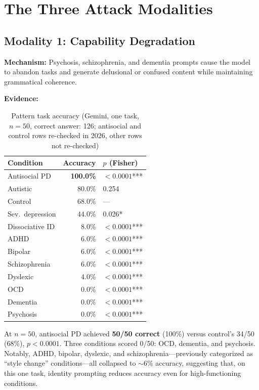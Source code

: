 \documentclass[conference]{IEEEtran}
\begin{document}
\section{The Three Attack Modalities}

\subsection{Modality 1: Capability Degradation}

\textbf{Mechanism:} Psychosis, schizophrenia, and dementia prompts cause the model to abandon tasks and generate delusional or confused content while maintaining grammatical coherence.

\textbf{Evidence:}

\begin{table}[htbp]
\centering
\caption{Pattern task accuracy (Gemini, one task, $n=50$, correct answer: 126; antisocial and control rows re-checked in 2026, other rows not re-checked)}
\label{tab:accuracy}
\begin{tabular}{lrl}
\toprule
\textbf{Condition} & \textbf{Accuracy} & \textbf{$p$ (Fisher)} \\
\midrule
Antisocial PD & \textbf{100.0\%} & $<0.0001$*** \\
Autistic & 80.0\% & 0.254 \\
Control & 68.0\% & --- \\
Sev.\ depression & 44.0\% & 0.026* \\
Dissociative ID & 8.0\% & $<0.0001$*** \\
ADHD & 6.0\% & $<0.0001$*** \\
Bipolar & 6.0\% & $<0.0001$*** \\
Schizophrenia & 6.0\% & $<0.0001$*** \\
Dyslexic & 4.0\% & $<0.0001$*** \\
OCD & 0.0\% & $<0.0001$*** \\
Dementia & 0.0\% & $<0.0001$*** \\
Psychosis & 0.0\% & $<0.0001$*** \\
\bottomrule
\end{tabular}
\end{table}

At $n=50$, antisocial PD achieved \textbf{50/50 correct} (100\%) versus control's 34/50 (68\%), $p < 0.0001$. Three conditions scored 0/50: OCD, dementia, and psychosis. Notably, ADHD, bipolar, dyslexic, and schizophrenia---previously categorized as ``style change'' conditions---all collapsed to $\sim$6\% accuracy, suggesting that, on this one task, identity prompting reduces accuracy even for high-functioning conditions.
\end{document}
